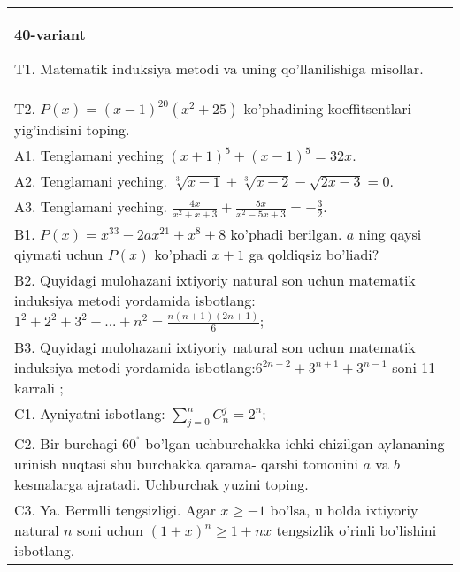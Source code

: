 \documentclass{article}
\begin{document}
\begin{tabular}{m{17cm}}
\textbf{40-variant}
\newline

T1. Matematik induksiya metodi va uning qo'llanilishiga misollar. \\
T2. \(P(x) = (x - 1)^{20}\left( x^{2} + 25 \right)\) ko'phadining koeffitsentlari yig'indisini toping. \\
A1. Tenglamani yeching \((x + 1)^{5} + (x - 1)^{5} = 32x\). \\
A2. Tenglamani yeching. \(\sqrt[3]{x - 1} + \sqrt[3]{x - 2} - \sqrt{2x - 3} = 0\). \\
A3. Tenglamani yeching. \(\frac{4x}{x^{2} + x + 3} + \frac{5x}{x^{2} - 5x + 3} = - \frac{3}{2}\). \\
B1. \(P(x) = x^{33} - 2ax^{21} + x^{8} + 8\) ko'phadi berilgan. \(a\) ning qaysi qiymati uchun \(P(x)\) ko'phadi \(x + 1\) ga qoldiqsiz bo'liadi? \\
B2. Quyidagi mulohazani ixtiyoriy natural son uchun matematik induksiya metodi yordamida isbotlang: \(1^{2} + 2^{2} + 3^{2} + ... + n^{2} = \frac{n(n + 1)(2n + 1)}{6}\); \\
B3. Quyidagi mulohazani ixtiyoriy natural son uchun matematik induksiya metodi yordamida isbotlang:\(6^{2n - 2} + 3^{n + 1} + 3^{n - 1}\) soni 11 karrali ; \\
C1. Ayniyatni isbotlang: \(\sum_{j = 0}^{n}C_{n}^{j} = 2^{n}\); \\
C2. Bir burchagi \(60^{{^\circ}}\) bo'lgan uchburchakka ichki chizilgan aylananing urinish nuqtasi shu burchakka qarama- qarshi tomonini \(a\) va \(b\) kesmalarga ajratadi. Uchburchak yuzini toping. \\
C3. Ya. Bermlli tengsizligi. Agar \(x \geq - 1\) bo'lsa, u holda ixtiyoriy natural \(n\) soni uchun \((1 + x)^{n} \geq 1 + nx\) tengsizlik o'rinli bo'lishini isbotlang. \\

\end{tabular}
\vspace{1cm}
\end{document}
